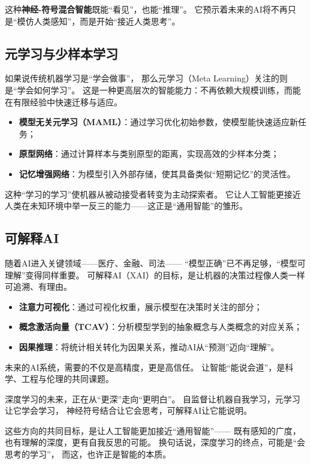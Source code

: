 这种\textbf{神经-符号混合智能}既能“看见”，也能“推理”。  
它预示着未来的AI将不再只是“模仿人类感知”，而是开始“接近人类思考”。

\subsection{元学习与少样本学习}

如果说传统机器学习是“学会做事”，  
那么元学习（Meta Learning）关注的则是“学会如何学习”。  
这是一种更高层次的智能能力：不再依赖大规模训练，而能在有限经验中快速迁移与适应。

\begin{itemize}
\item \textbf{模型无关元学习（MAML）}：通过学习优化初始参数，使模型能快速适应新任务；
\item \textbf{原型网络}：通过计算样本与类别原型的距离，实现高效的少样本分类；
\item \textbf{记忆增强网络}：为模型引入外部存储，使其具备类似“短期记忆”的灵活性。
\end{itemize}

这种“学习的学习”使机器从被动接受者转变为主动探索者。  
它让人工智能更接近人类在未知环境中举一反三的能力——这正是“通用智能”的雏形。

\subsection{可解释AI}

随着AI进入关键领域——医疗、金融、司法——  
“模型正确”已不再足够，“模型可理解”变得同样重要。  
可解释AI（XAI）的目标，是让机器的决策过程像人类一样可追溯、有理由。

\begin{itemize}
\item \textbf{注意力可视化}：通过可视化权重，展示模型在决策时关注的部分；
\item \textbf{概念激活向量（TCAV）}：分析模型学到的抽象概念与人类概念的对应关系；
\item \textbf{因果推理}：将统计相关转化为因果关系，推动AI从“预测”迈向“理解”。
\end{itemize}

未来的AI系统，需要的不仅是高精度，更是高信任。  
让智能“能说会道”，是科学、工程与伦理的共同课题。

深度学习的未来，正在从“更深”走向“更明白”。  
自监督让机器自我学习，元学习让它学会学习，  
神经符号结合让它会思考，可解释AI让它能说明。  

这些方向的共同目标，是让人工智能更加接近“通用智能”——  
既有感知的广度，也有理解的深度，更有自我反思的可能。  
换句话说，深度学习的终点，可能是“会思考的学习”，  
而这，也许正是智能的本质。


